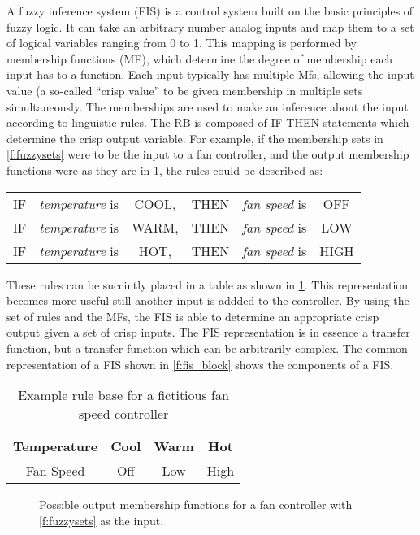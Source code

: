 A fuzzy inference system (FIS) is a control system built on the basic principles of fuzzy
logic\cite{kosko:91bk}\cite{kosko:93sciam}. It can take an arbitrary number analog inputs and map them to a
set of logical variables ranging from 0 to 1. This mapping is performed by membership functions (MF), which
determine the degree of membership each input has to a function. Each input typically has multiple Mfs,
allowing the input value (a so-called ``crisp value'' to be given membership in multiple sets
simultaneously. The memberships are used to make an inference about the input according to linguistic rules.
The RB is composed of IF-THEN statements which determine the crisp output variable. For example, if the
membership sets in \cref{f:fuzzysets} were to be the input to a fan controller, and the output membership
functions were as they are in \cref{f:outputfan}, the rules could be described as:

\vspace{2em}
\begin{tabular}{cccccc}
        IF &  \emph{temperature} is & COOL, & THEN & \emph{fan speed} is & OFF\\
        IF &  \emph{temperature} is & WARM, & THEN & \emph{fan speed} is & LOW\\
        IF &  \emph{temperature} is & HOT,  & THEN & \emph{fan speed} is & HIGH
\end{tabular}
\vspace{2em}

These rules can be succintly placed in a table as shown in \cref{t:fanspeed}. This representation becomes more
useful still another input is addded to the controller. By using the set of rules and the MFs, the FIS is able
to determine an appropriate crisp output given a set of crisp inputs. The FIS representation is in essence a
transfer function, but a transfer function which can be arbitrarily complex. The common representation of a
FIS shown in \cref{f:fis_block} shows the components of a FIS.

\begin{table}[ht]
    \centering
    \caption{Example rule base for a fictitious fan speed controller}\label{t:fanspeed}
    \begin{tabular}{c|c|c|c}
        Temperature & Cool & Warm & Hot\\\hline
        Fan Speed & Off & Low & High
    \end{tabular}
\end{table}

\begin{figure}[ht]
    \centering
    
    \caption{Possible output membership functions for a fan controller with \cref{f:fuzzysets} as the
    input.}\label{f:outputfan}
\end{figure}

